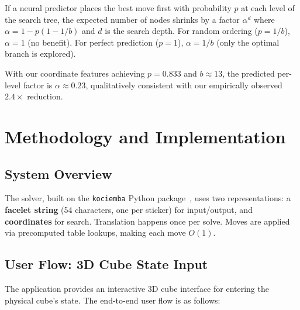\documentclass[graybox]{svmult}
\begin{document}
\begin{theorem}
\label{thm:node-reduction}
If a neural predictor places the best move first with probability $p$ at each level of the search tree, the expected number of nodes shrinks by a factor $\alpha^d$ where $\alpha = 1 - p(1 - 1/b)$ and $d$ is the search depth. For random ordering ($p = 1/b$), $\alpha = 1$ (no benefit). For perfect prediction ($p = 1$), $\alpha = 1/b$ (only the optimal branch is explored).
\end{theorem}

With our coordinate features achieving $p = 0.833$ and $b \approx 13$, the predicted per-level factor is $\alpha \approx 0.23$, qualitatively consistent with our empirically observed $2.4{\times}$ reduction.

\section{Methodology and Implementation}
\label{sec:method}

\subsection{System Overview}
The solver, built on the \texttt{kociemba} Python package~\cite{muodov}, uses two representations: a \textbf{facelet string} (54 characters, one per sticker) for input/output, and \textbf{coordinates} for search. Translation happens once per solve. Moves are applied via precomputed table lookups, making each move $O(1)$.

\subsection{User Flow: 3D Cube State Input}
\label{sec:user-flow}

The application provides an interactive 3D cube interface for entering the physical cube's state. The end-to-end user flow is as follows:
\end{document}
